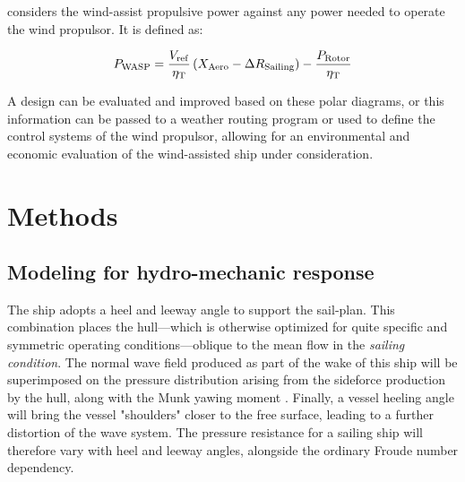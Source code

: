 \documentclass[twoside,twocolumn]{article}
\begin{document}
\PWASP considers the wind-assist propulsive power against any power needed to operate the wind propulsor. It is defined as:

\begin{equation}
P_{\mathrm{WASP}}=\frac{V_{\mathrm{ref}}}{\eta_{\mathrm{T}}} \left( X_{\mathrm{Aero}}-\Delta R_{\mathrm{Sailing}} \right) -\frac{P_{\mathrm{Rotor}}}{\eta_{\mathrm{T}}}
\label{eq:Pwasp}
\end{equation}

A design can be evaluated and improved based on these polar diagrams, or this information can be passed to a weather routing program or used to define the control systems of the wind propulsor, allowing for an environmental and economic evaluation of the wind-assisted ship under consideration.

\section{Methods}

\subsection{Modeling for hydro-mechanic response}

The ship adopts a heel and leeway angle to support the sail-plan. This combination places the hull---which is otherwise optimized for quite specific and symmetric operating conditions---oblique to the mean flow in the \textit{sailing condition}. The normal wave field produced as part of the wake of this ship will be superimposed on the pressure distribution arising from the sideforce production by the hull, along with the Munk yawing moment \cite{Munk1924}. Finally, a vessel heeling angle will bring the vessel "shoulders" closer to the free surface, leading to a further distortion of the wave system. The pressure resistance for a sailing ship will therefore vary with heel and leeway angles, alongside the ordinary Froude number dependency.
\end{document}
